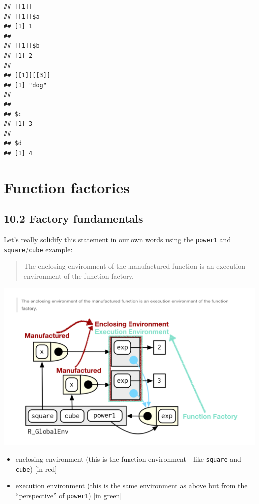 \documentclass[]{book}
\providecommand{\tightlist}{%
  \setlength{\itemsep}{0pt}\setlength{\parskip}{0pt}}
\begin{document}
\begin{verbatim}
## [[1]]
## [[1]]$a
## [1] 1
## 
## [[1]]$b
## [1] 2
## 
## [[1]][[3]]
## [1] "dog"
## 
## 
## $c
## [1] 3
## 
## $d
## [1] 4
\end{verbatim}

\hypertarget{function-factories}{%
\chapter{Function factories}\label{function-factories}}

\hypertarget{factory-fundamentals}{%
\section*{10.2 Factory fundamentals}\label{factory-fundamentals}}

Let's really solidify this statement in our own words using the \texttt{power1} and \texttt{square}/\texttt{cube} example:

\begin{quote}
The enclosing environment of the manufactured function is an execution environment of the function factory.
\end{quote}

\includegraphics[width=24.25in]{images/factories1}

\begin{itemize}
\tightlist
\item
  enclosing environment (this is the function environment - like \texttt{square} and \texttt{cube}) {[}in red{]}
\item
  execution environment (this is the same environment as above but from the ``perspective'' of \texttt{power1}) {[}in green{]}
\end{itemize}
\end{document}
